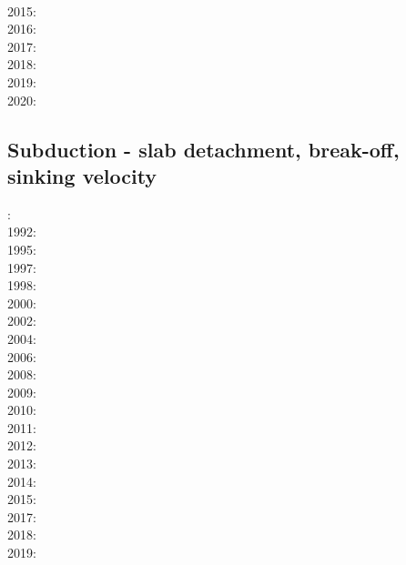 {      \cite{gagd14}\cite{voge14}\cite{voge14b}\cite{lidr14}\cite{bocj04}\cite{bagb14}\cite{stjm14}
      \cite{basc14}\cite{vamd14}\cite{kile14}\cite{jahm14}\cite{bufa14}\cite{bufy14b}\cite{chsv14}
      \cite{chsg14}\cite{sigb14}\cite{shjm14}\cite{mova14}\\
2015: \cite{bemm15}\cite{bomv15}\cite{bogf15}\cite{ceag15}\cite{kifr15}\cite{vami15}\cite{dali15}
      \cite{mami15}\cite{rula15}\cite{chsd15}\cite{dusc15}\cite{yotr15}\cite{cibi15}\\
2016: \cite{tomy16}\cite{gukt16}\cite{robn16}\cite{mavm16}\cite{magc16}\cite{marl16}\cite{mesj16}
      \cite{jada16}\cite{jada16b}\cite{liku16}\cite{chss16}\\
2017: \cite{kicf17}\cite{sche17}\cite{pest17}\cite{vomc17}\cite{majf17}\cite{yabr17}\cite{shwl17}\\
2018: \cite{yamz18}\cite{crli18}\cite{spcv18}\cite{chss18}\cite{yagz18}\cite{mazh18}\cite{pukp18}
      \cite{masg18}\cite{biar18}\\
2019: \cite{magn19}\cite{mavb19}\cite{scvm19}\cite{cakc19}\cite{samo19}\cite{sihf19}\cite{meag19}
      \cite{vaws19}\cite{bokg19}\\
2020: \cite{algg20}
}

\subsection{Subduction - slab detachment, break-off, sinking velocity}


{\scriptsize
{}: \cite{futo85}\\
1992: \cite{wosp92}\\
1995: \cite{yowo95}\cite{voda95}\cite{davo95}\\
1997: \cite{wowo97}\\
1998: \cite{desw98}\cite{caws98}\\
2000: \cite{wosp00}\\
2002: \cite{bugw02}\\
2004: \cite{geym04}\\
2006: \cite{fabm06}\\
2008: \cite{zlfd08}\\
2009: \cite{anbi09}\cite{bubi09}\cite{vasv09}\\
2010: \cite{bubi10}\cite{bagc10}\\
2011: \cite{dugm11}\cite{vaal11}\cite{schm11}\\
2012: \cite{dugk12}\cite{dusg12}\\
2013: \cite{care13}\cite{mafv13}\cite{ghbu13}\cite{duge13}\\
2014: \cite{dugs14}\cite{besr14}\cite{vosd14}\cite{butm14}\\
2015: \cite{vosc15}\cite{fohk15}\\
2017: \cite{frbm17}\cite{maav17}\\
2018: \cite{garm18}\cite{bezb18}\\
2019: \cite{beml19}
}

